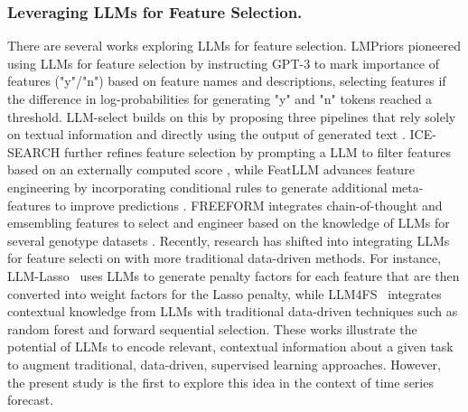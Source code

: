 \documentclass[conference]{IEEEtran}
\newcommand{\fm}[1]{\textcolor{magenta}{FM: #1}}
\begin{document}
\subsubsection{Leveraging LLMs for Feature Selection.} 
There are several works exploring LLMs for feature selection. 
LMPriors pioneered using LLMs for feature selection by instructing GPT-3 to mark importance of features ("y"/"n") based on feature names and descriptions, selecting features if the difference in log-probabilities for generating "y" and "n" tokens reached a threshold\cite{choi_lmpriors_2022}. LLM-select builds on this by proposing three pipelines that rely solely on textual information and directly using the output of generated text \cite{jeong_llm-select_2024}. ICE-SEARCH further refines feature selection by prompting a LLM to filter features based on an externally computed score \cite{yang_ice-search_2024}, while FeatLLM advances feature engineering by incorporating conditional rules to generate additional meta-features to improve predictions \cite{han_large_2024}. FREEFORM integrates chain-of-thought and emsembling features to select and engineer based on the knowledge of LLMs for several genotype datasets \cite{lee_knowledge-driven_2024}. Recently, research has shifted into integrating LLMs for feature selecti
on with more traditional data-driven methods. For instance, LLM-Lasso~\cite{zhang_llm-lasso_2025} uses LLMs to generate penalty factors for each feature that are then converted into weight factors for the Lasso penalty, while LLM4FS~\cite{li_llm4fs_2025} integrates contextual knowledge from LLMs with traditional data-driven techniques such as random forest and forward sequential selection. These works illustrate the potential of LLMs to encode relevant, contextual information about a given task to augment traditional, data-driven, supervised learning approaches. However, the present study is the first to explore this idea in the context of time series forecast.
\end{document}
